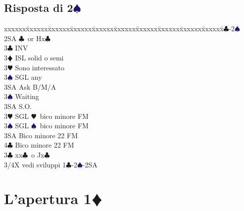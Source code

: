 \documentclass[a4paper,italian]{article}
\newcommand{\BC}{\textcolor{OliveGreen}{$\clubsuit$}}
\newcommand{\BD}{\textcolor{RedOrange}{$\vardiamondsuit$}}
\newcommand{\BH}{\textcolor{Red2}{$\varheartsuit${}}}
\newcommand{\BS}{\textcolor{MidnightBlue}{$\spadesuit${}}}
\newcommand{\pdfd}{\texorpdfstring{\BD{}}{D}}
\newcommand{\pdfs}{\texorpdfstring{\BS{}}{S}}
\newenvironment{bidtable}
{\begin{tabbing}

    xxxxxx\=xxxxxx\=xxxxxx\=xxxxxx\=xxxxxx\=xxxxxx\=xxxxxx\=xxxxxx\=xxxxxx\=xxxxxx\=\kill}
{\end{tabbing} }%
\begin{document}
\begin{minipage}[t]{.493\textwidth}

    \subsection{Risposta di 2\pdfs}

    \begin{bidtable}
        1\BC-2\BS\+\\
        2SA \BC\ or Hx\BC \+\\
        3\BC \> INV\\
        3\BD \> ISL solid o semi\+\\
        3\BH \> Sono interessato\+\\
        3\BS \> SGL any\+\\
        3SA \> Ask B/M/A\-\-\\
        3\BS \> Waiting\\
        3SA \> S.O.\-\\
        3\BH \> SGL \BH\ bico minore FM\\
        3\BS \> SGL \BS\ bico minore FM\\
        3SA \> Bico minore 22 FM\\
        4\BC \> Bico minore 22 FM\-\\
        3\BC \> xx\BC\ o Jx\BC \+\\
        3/4X \> vedi sviluppi 1\BC -2\BS -2SA\-\-
    \end{bidtable}
\end{minipage}
{
    {\vrule width 1pt}
}
\newpage

\section{L'apertura 1\pdfd}
\end{document}
